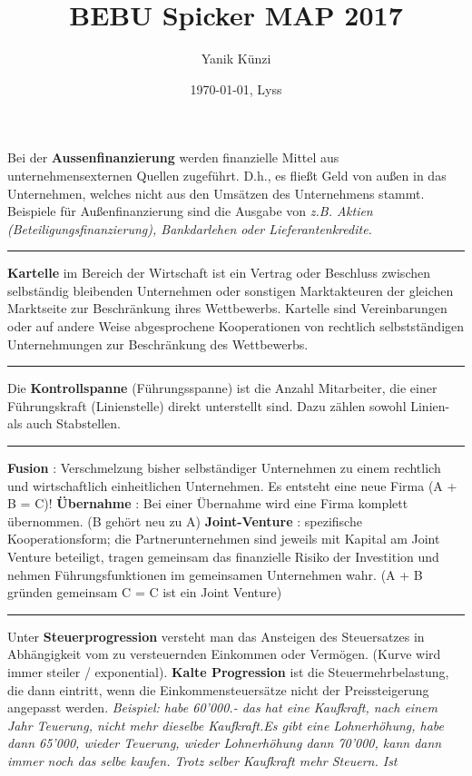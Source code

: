 \documentclass{article} %
\title{BEBU Spicker MAP 2017}
\author{Yanik Künzi}
\date{\today{}, Lyss}
\begin{document}
	\begin{minipage}[t][0.8\textheight]{0.97\textwidth}
	 \begin{multicols*}{4}
		\begin{flushleft}
		{\tiny
			\noindent Bei der \textbf{Aussenfinanzierung} werden finanzielle 
			Mittel aus unternehmensexternen Quellen zugeführt.
			D.h., es fließt Geld von außen
			in das Unternehmen, welches nicht aus den
			Umsätzen des Unternehmens stammt.
			Beispiele für Außenfinanzierung sind die Ausgabe
			von \textit{z.B. Aktien (Beteiligungsfinanzierung),
			Bankdarlehen oder Lieferantenkredite.}
			\noindent\rule{\linewidth}{0.4pt}
			\textbf{Kartelle} im Bereich der Wirtschaft ist ein
			Vertrag oder Beschluss zwischen selbständig
			bleibenden Unternehmen oder sonstigen
			Marktakteuren der gleichen Marktseite zur
			Beschränkung ihres Wettbewerbs. Kartelle sind
			Vereinbarungen oder auf andere Weise
			abgesprochene Kooperationen von rechtlich
			selbstständigen Unternehmungen zur
			Beschränkung des Wettbewerbs.
			\noindent\rule{\linewidth}{0.4pt}
			Die \textbf{Kontrollspanne} (Führungsspanne) ist
			die Anzahl Mitarbeiter, die einer
			Führungskraft (Linienstelle) direkt unterstellt
			sind. Dazu zählen sowohl Linien- als auch Stabstellen.
			\noindent\rule{\linewidth}{0.4pt}
			\textbf{Fusion} : Verschmelzung bisher selbständiger
			Unternehmen zu einem rechtlich und
			wirtschaftlich einheitlichen Unternehmen. Es
			entsteht eine neue Firma (A + B = C)!
			\textbf{Übernahme} : Bei einer Übernahme wird eine
			Firma komplett übernommen. (B gehört neu zu A)
			\textbf{Joint-Venture} : spezifische Kooperationsform;
			die Partnerunternehmen sind jeweils mit Kapital
			am Joint Venture beteiligt, tragen gemeinsam das
			finanzielle Risiko der Investition und nehmen
			Führungsfunktionen
			im gemeinsamen Unternehmen wahr. (A + B
			gründen gemeinsam C = C ist ein Joint Venture)
			\noindent\rule{\linewidth}{0.4pt}
			Unter \textbf{Steuerprogression} versteht man das
			Ansteigen des Steuersatzes in Abhängigkeit vom
			zu versteuernden Einkommen oder Vermögen.
			(Kurve wird immer steiler / exponential).
			\textbf{Kalte Progression} ist die
			Steuermehrbelastung, die dann eintritt, wenn die
			Einkommensteuersätze nicht der
			Preissteigerung angepasst werden.
			\textit{Beispiel: habe 60'000.- das hat eine Kaufkraft,
			nach einem Jahr Teuerung, nicht mehr dieselbe
			Kaufkraft.Es gibt eine Lohnerhöhung, habe dann
			65'000, wieder Teuerung, wieder Lohnerhöhung
			dann 70'000, kann dann immer noch das selbe
			kaufen. Trotz selber Kaufkraft mehr Steuern. Ist
}}
\end{flushleft}
\end{multicols*}
\end{minipage}
\end{document}
